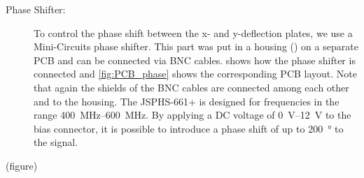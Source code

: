 \begin{description}
	\item[Phase Shifter:] To control the phase shift between the x- and y-deflection plates, we use a Mini-Circuits \cite{JSPHS-661} phase shifter. This part was put in a  housing (\cite{Hammond1455D601RD}) on a separate PCB and can be connected via BNC cables.  shows how the phase shifter is connected and \cref{fig:PCB_phase} shows the corresponding PCB layout. Note that again the shields of the BNC cables are connected among each other and to the housing. The JSPHS-661+ is designed for frequencies in the range \SIrange{400}{600}{\mega\hertz}. By applying a DC voltage of \SIrange{0}{12}{\volt} to the bias connector, it is possible to introduce a phase shift of up to \SI{200}{\degree} to the signal.
	
\end{description}

(figure)\\

